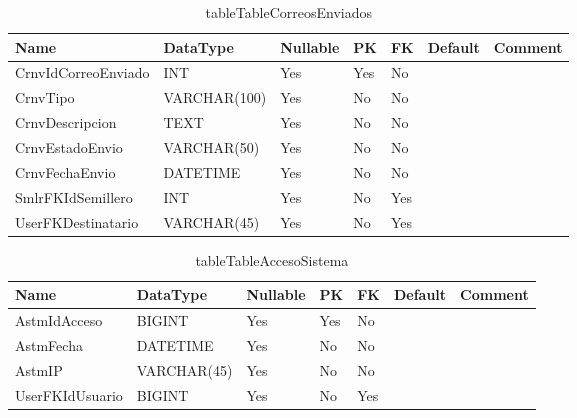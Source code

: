 \begin{table}
	\caption{tableTableCorreosEnviados}
	\label{labelTableCorreosEnviados}
	\begin{tabular}{ |l|l|l|l|l|l|l| }
		\hline
		Name & DataType & Nullable & PK & FK & Default & Comment \\ \hline
		CrnvIdCorreoEnviado & INT & Yes & Yes & No &  & \\ \hline 
		CrnvTipo & VARCHAR(100) & Yes & No & No &  & \\ \hline 
		CrnvDescripcion & TEXT & Yes & No & No &  & \\ \hline 
		CrnvEstadoEnvio & VARCHAR(50) & Yes & No & No &  & \\ \hline 
		CrnvFechaEnvio & DATETIME & Yes & No & No &  & \\ \hline 
		SmlrFKIdSemillero & INT & Yes & No & Yes &  & \\ \hline 
		UserFKDestinatario & VARCHAR(45) & Yes & No & Yes &  & \\ \hline 
		
	\end{tabular}
\end{table}


\begin{table}
	\caption{tableTableAccesoSistema}
	\label{labelTableAccesoSistema}
	\begin{tabular}{ |l|l|l|l|l|l|l| }
		\hline
		Name & DataType & Nullable & PK & FK & Default & Comment \\ \hline
		AstmIdAcceso & BIGINT & Yes & Yes & No &  & \\ \hline 
		AstmFecha & DATETIME & Yes & No & No &  & \\ \hline 
		AstmIP & VARCHAR(45) & Yes & No & No &  & \\ \hline 
		UserFKIdUsuario & BIGINT & Yes & No & Yes &  & \\ \hline 
		
	\end{tabular}
\end{table}


